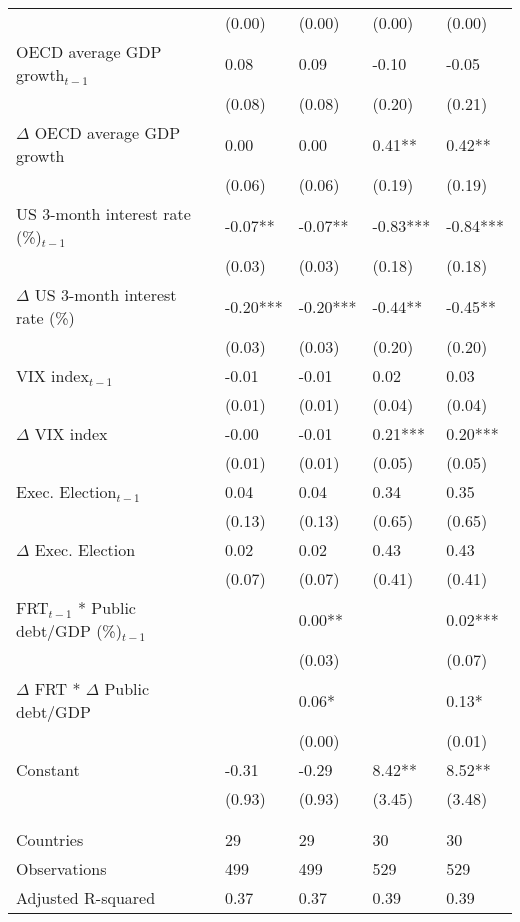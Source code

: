 \begin{tabular}{lp{3cm}p{3cm}p{3cm}p{3cm}}
   & (0.00) & (0.00) & (0.00) & (0.00) \\ 
  OECD average GDP growth$_{t-1}$ & 0.08 & 0.09 & -0.10 & -0.05 \\ 
   & (0.08) & (0.08) & (0.20) & (0.21) \\ 
  $\Delta$ OECD average GDP growth & 0.00 & 0.00 & 0.41** & 0.42** \\ 
   & (0.06) & (0.06) & (0.19) & (0.19) \\ 
  US 3-month interest rate (\%)$_{t-1}$ & -0.07** & -0.07** & -0.83*** & -0.84*** \\ 
   & (0.03) & (0.03) & (0.18) & (0.18) \\ 
  $\Delta$ US 3-month interest rate (\%) & -0.20*** & -0.20*** & -0.44** & -0.45** \\ 
   & (0.03) & (0.03) & (0.20) & (0.20) \\ 
  VIX index$_{t-1}$ & -0.01 & -0.01 & 0.02 & 0.03 \\ 
   & (0.01) & (0.01) & (0.04) & (0.04) \\ 
  $\Delta$ VIX index & -0.00 & -0.01 & 0.21*** & 0.20*** \\ 
   & (0.01) & (0.01) & (0.05) & (0.05) \\ 
  Exec. Election$_{t-1}$ & 0.04 & 0.04 & 0.34 & 0.35 \\ 
   & (0.13) & (0.13) & (0.65) & (0.65) \\ 
  $\Delta$ Exec. Election & 0.02 & 0.02 & 0.43 & 0.43 \\ 
   & (0.07) & (0.07) & (0.41) & (0.41) \\ 
  FRT$_{t-1}$ * Public debt/GDP (\%)$_{t-1}$ &  & 0.00** &  & 0.02*** \\ 
   &  & (0.03) &  & (0.07) \\ 
  $\Delta$ FRT * $\Delta$ Public debt/GDP &  & 0.06* &  & 0.13* \\ 
   &  & (0.00) &  & (0.01) \\ 
  Constant & -0.31 & -0.29 & 8.42** & 8.52** \\ 
   & (0.93) & (0.93) & (3.45) & (3.48) \\ 
   &  &  &  &  \\ 
   &  &  &  &  \\ 
  Countries & 29 & 29 & 30 & 30 \\ 
  Observations & 499 & 499 & 529 & 529 \\ 
  Adjusted R-squared & 0.37 & 0.37 & 0.39 & 0.39 \\ 
   \hline
\end{tabular}
\endgroup
